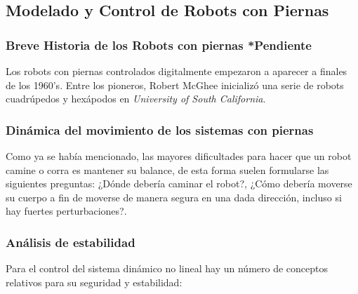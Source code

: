 		\subsection*{Modelado y Control de Robots con Piernas}
			\subsubsection*{Breve Historia de los Robots con piernas *Pendiente}
		Los robots con piernas controlados digitalmente empezaron a aparecer a finales de los 1960's. Entre los pioneros, Robert McGhee inicializó una serie de robots cuadrúpedos y hexápodos en \textit{University of South California}.\\

			\subsubsection*{Dinámica del movimiento de los sistemas con piernas}
Como ya se había mencionado, las mayores dificultades para hacer que un robot camine o corra es mantener su balance, de esta forma suelen formularse las siguientes preguntas: ¿Dónde debería caminar el robot?, ¿Cómo debería moverse su cuerpo a fin de moverse de manera segura en una dada dirección, incluso si hay fuertes perturbaciones?.\\ 

			\subsubsection*{Análisis de estabilidad}

Para el control del sistema dinámico no lineal hay  un número de conceptos relativos para su seguridad y estabilidad:

